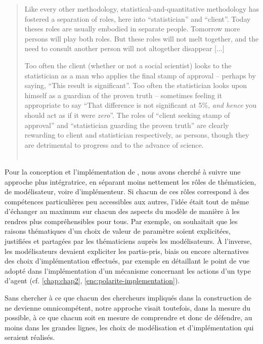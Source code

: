 \begin{quotation}
	\noindent \og Like every other methodology, statistical-and-quantitative methodology has fostered a separation of roles, here into “statistician” and “client”. Today theses roles are usually embodied in separate people. Tomorrow more persons will play both roles. But these roles will not melt together, and the need to consult another person will not altogether disappear [...]
	
	Too often the client (whether or not a social scientist) looks to the statistician as a man who applies the final stamp of approval -- perhaps by saying, “This result is significant”. Too often the statistician looks upon himself as a guardian of the proven truth -- sometimes feeling it appropriate to say “That difference is not significant at 5\%, \textit{and hence} you should act as if it were \textit{zero}”. The roles of “client seeking stamp of approval” and “statistician guarding the proven truth” are clearly rewarding to client and statistician respectively, as persons, though they are detrimental to progress and to the advance of science.\fg{} \\
	\mbox{}~ \hfill \cite[145]{jones_statistical_1986}
\end{quotation}

Pour la conception et l'implémentation de \simfeodal{}, nous avons cherché à suivre une approche plus intégratrice, en séparant moins nettement les rôles de thématicien, de modélisateur, voire d'\og{}implémenteur\fg{}.
Si chacun de ces rôles correspond à des compétences particulières peu accessibles aux autres, l'idée était tout de même d'échanger au maximum sur chacun des aspects du modèle de manière à les rendres plus compréhensibles pour tous.
Par exemple, on souhaitait que les raisons thématiques d'un choix de valeur de paramètre soient explicitées, justifiées et partagées par les thématiciens auprès les modélisateurs.
À l'inverse, les modélisateurs devaient expliciter les partis-pris, biais ou encore alternatives des choix d'implémentation effectués, par exemple en détaillant le point de vue adopté dans l'implémentation d'un mécanisme concernant les actions d'un type d'agent (cf. \cref{chap:chap2}, \cref{enc:polarite-implementation}).

Sans chercher à ce que chacun des chercheurs impliqués dans la construction de \simfeodal{} ne devienne omnicompétent, notre approche visait toutefois, dans la mesure du possible, à ce que chacun soit en mesure de comprendre et donc de défendre, au moins dans les grandes lignes, les choix de modélisation et d'implémentation qui seraient réalisés.

